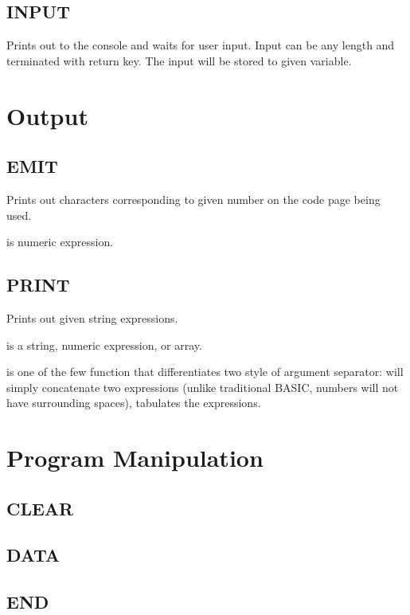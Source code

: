     \subsection{INPUT}
        \par
        Prints out  to the console and waits for user input. Input can be any length and terminated with return key. The input will be stored to given variable.

\section{Output}

    \subsection{EMIT}
        \par
        Prints out characters corresponding to given number on the code page being used.\par
         is numeric expression.
    \subsection{PRINT}
        \par
        Prints out given string expressions.\par
         is a string, numeric expression, or array.\par
         is one of the few function that differentiates two style of argument separator: \codebf{;} will simply concatenate two expressions (unlike traditional BASIC, numbers will not have surrounding spaces), \codebf{,} tabulates the expressions.

\section{Program Manipulation}

    \subsection{CLEAR}
    \subsection{DATA}
    \subsection{END}
